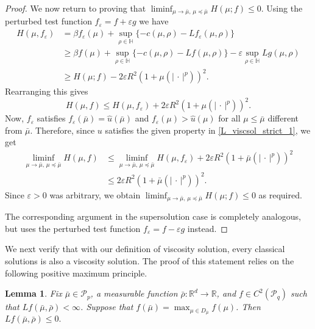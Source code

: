 \documentclass{article}
\newtheorem{lemma}[theorem]{Lemma}
\theoremstyle{definition}
\numberwithin{equation}{section}
\numberwithin{theorem}{section}
\newcommand{\R}{\mathbb{R}}
\newcommand{\Hb}{\mathbb{H}}
\renewcommand{\r}{R}
\newcommand{\Pcal}{{\mathcal P}}
\newcommand{\fdot}{{\,\cdot\,}}
\begin{document}
\begin{proof}
We now return to proving that $\liminf_{\mu\to\bar\mu,\, \mu\preceq\bar\mu} H(\mu;f) \le 0$. Using the perturbed test function $f_\varepsilon = f + \varepsilon g$ we have
\begin{align*}
H(\mu, f_\varepsilon) &= \beta f_\varepsilon(\mu) + \sup_{\rho \in \Hb} \{ - c(\mu,\rho) - Lf_\varepsilon(\mu,\rho) \} \\
&\ge \beta f(\mu) + \sup_{\rho \in \Hb} \{ - c(\mu,\rho) - Lf(\mu,\rho) \} - \varepsilon \sup_{\rho \in \Hb} Lg(\mu,\rho) \\
&\ge H(\mu; f) - 2 \varepsilon \r^2 (1 + \mu(|\fdot|^p))^2.
\end{align*}
Rearranging this gives
\[
H(\mu,f) \le H(\mu, f_\varepsilon) + 2 \varepsilon \r^2 (1 + \mu(|\fdot|^p))^2.
\]
Now, $f_\varepsilon$ satisfies $f_\varepsilon(\bar\mu) = \hat u(\bar \mu)$ and $f_\varepsilon(\mu) > \hat u(\mu)$ for all $\mu \le \bar\mu$ different from $\bar\mu$. Therefore, since $u$ satisfies the given property in \ref{L_viscsol_strict_1}, we get
\begin{align*}
\liminf_{\mu\to\bar\mu,\, \mu\preceq\bar\mu} H(\mu,f) &\le \liminf_{\mu\to\bar\mu,\, \mu\preceq\bar\mu} H(\mu, f_\varepsilon) + 2 \varepsilon \r^2 (1 + \bar\mu(|\fdot|^p))^2 \\
&\le 2 \varepsilon \r^2 (1 + \bar\mu(|\fdot|^p))^2.
\end{align*}
Since $\varepsilon>0$ was arbitrary, we obtain $\liminf_{\mu\to\bar\mu,\, \mu\preceq\bar\mu} H(\mu;f) \le 0$ as required.

The corresponding argument in the supersolution case is completely analogous, but uses the perturbed test function $f_\varepsilon = f - \varepsilon g$ instead.
\end{proof}




We next verify that with our definition of viscosity solution, every classical solutions is also a viscosity solution. The proof of this statement relies on the following positive maximum principle.


\begin{lemma}\label{PMP1}
Fix $\bar \mu\in \Pcal_p$, a measurable function $\bar\rho\colon {\R^d}\to\R$,  and  $f\in C^2(\Pcal_q)$ 
such that $Lf(\bar \mu,\bar  \rho)<\infty$. Suppose that
 $f(\bar \mu)=\max_{\mu\in D_{\bar \mu}}f(\mu)$. Then
$Lf(\bar \mu,\bar  \rho)\leq0.$
\end{lemma}
\end{document}
